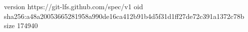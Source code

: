version https://git-lfs.github.com/spec/v1
oid sha256:a48a20053665281958a990de16ca412b91b4d5f31d1ff27de72c391a1372c78b
size 174940
